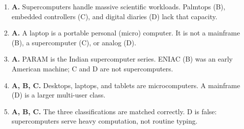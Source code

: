 \documentclass[11pt]{article}
\begin{document}
\begin{enumerate}[label=\textbf{Q\arabic*.}, leftmargin=*]
\item \textbf{A.} Supercomputers handle massive scientific workloads. Palmtops (B), embedded controllers (C), and digital diaries (D) lack that capacity.
\item \textbf{A.} A laptop is a portable personal (micro) computer. It is not a mainframe (B), a supercomputer (C), or analog (D).
\item \textbf{A.} PARAM is the Indian supercomputer series. ENIAC (B) was an early American machine; C and D are not supercomputers.
\item \textbf{A, B, C.} Desktops, laptops, and tablets are microcomputers. A mainframe (D) is a larger multi-user class.
\item \textbf{A, B, C.} The three classifications are matched correctly. D is false: supercomputers serve heavy computation, not routine typing.
\end{enumerate}
\def\JKSSBLessonID{2}\def\JKSSBAnswers{1}
\end{document}
